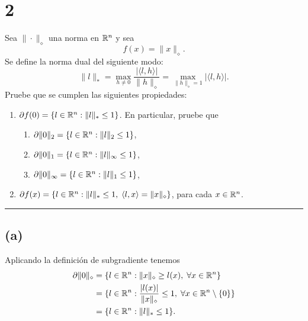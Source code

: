 \section*{2}

Sea $\| \cdot \|_{\diamond}$ una norma en $\mathbb{R}^n$ y sea
\begin{equation*}
    f(x) = \| x \|_{\diamond}.
\end{equation*}
Se define la norma dual del siguiente modo:
\begin{equation*}
    \| l \|_{*} 
        = \max_{h \neq 0} \frac{| \langle l, h \rangle |}{\| h \|_{\diamond}}
        = \max_{\| h \|_{\diamond} = 1} | \langle l, h \rangle |.
\end{equation*}
Pruebe que se cumplen las siguientes propiedades:
\begin{enumerate}[label=(\alph*)]
    \item $\partial f(0) = \{ l \in \mathbb{R}^n : \| l \|_{*} \leq 1 \}$. En particular, pruebe que
        \begin{enumerate}[label=(\alph{enumi}.\arabic*)]
            \item $\partial \| 0 \|_{2} = \{ l \in \mathbb{R}^n : \| l \|_{2} \leq 1 \}$,
            \item $\partial \| 0 \|_{1} = \{ l \in \mathbb{R}^n : \| l \|_{\infty} \leq 1 \}$,
            \item $\partial \| 0 \|_{\infty} = \{ l \in \mathbb{R}^n : \| l \|_{1} \leq 1 \}$,
        \end{enumerate}

    \item $\partial f(x) = \{ l \in \mathbb{R}^n : \| l \|_{*} \leq 1, \; \langle l, x \rangle = \| x \|_{\diamond} \}$,
        para cada $x \in \mathbb{R}^n$.
    
\end{enumerate}

\noindent\rule{10cm}{0.4pt}

\subsection*{(a)}

Aplicando la definición de subgradiente tenemos
\begin{equation*}
\begin{aligned}
    \partial \| 0 \|_{\diamond}
        & = \{ l \in \mathbb{R}^n : \| x \|_{\diamond} \geq l(x), \; \forall x \in \mathbb{R}^n \} \\
        & = \{ l \in \mathbb{R}^n : \frac{| l(x) |}{\| x \|_{\diamond}} \leq 1, \; \forall x \in \mathbb{R}^n \setminus \{ 0 \} \} \\
        & = \{ l \in \mathbb{R}^n : \| l \|_{*} \leq 1 \}. \\
\end{aligned}
\end{equation*}

